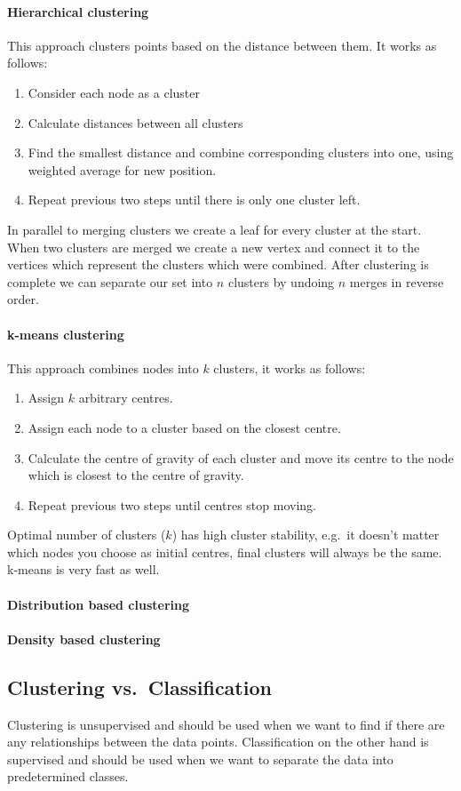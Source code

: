 \documentclass[a5paper]{report}
\begin{document}
\paragraph{Hierarchical clustering}
This approach clusters points based on the distance between them.
It works as follows:
\begin{enumerate}
\item Consider each node as a cluster
\item Calculate distances between all clusters
\item Find the smallest distance and combine corresponding clusters into one, using weighted average for new position.
\item Repeat previous two steps until there is only one cluster left.
\end{enumerate}
In parallel to merging clusters we create a leaf for every cluster at the start.
When two clusters are merged we create a new vertex and connect it to the vertices which represent the clusters which were combined.
After clustering is complete we can separate our set into $n$ clusters by undoing $n$ merges in reverse order.
\paragraph{k-means clustering}
This approach combines nodes into $k$ clusters, it works as follows:
\begin{enumerate}
\item Assign $k$ arbitrary centres.
\item Assign each node to a cluster based on the closest centre.
\item Calculate the centre of gravity of each cluster and move its centre to the node which is closest to the centre of gravity.
\item Repeat previous two steps until centres stop moving.
\end{enumerate}
Optimal number of clusters ($k$) has high cluster stability, e.g.\ it doesn't matter which nodes you choose as initial centres, final clusters will always be the same.
k-means is very fast as well.
\paragraph{Distribution based clustering} %
\paragraph{Density based clustering} %
\subsection{Clustering vs.\ Classification}
Clustering is unsupervised and should be used when we want to find if there are any relationships between the data points.
Classification on the other hand is supervised and should be used when we want to separate the data into predetermined classes.
\end{document}
